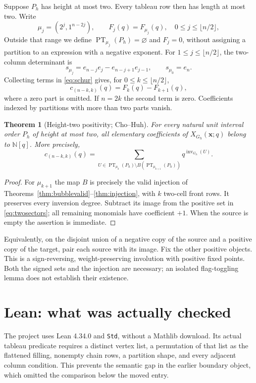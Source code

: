\documentclass[11pt,a4paper]{article}
\newtheorem{theorem}{Theorem}[section]
\theoremstyle{definition}
\newcommand{\PT}{\operatorname{PT}}
\newcommand{\inv}{\operatorname{inv}}
\newcommand{\N}{\mathbb N}
\begin{document}
Suppose $P_h$ has height at most two. Every tableau row then has length at
most two. Write
\[
 \mu_j=(2^j,1^{n-2j}),\qquad F_j(q)=F_{\mu_j}(q),
 \quad 0\le j\le\lfloor n/2\rfloor,
\]
Outside that range we define $\PT_{\mu_j}(P_h)=\varnothing$ and $F_j=0$,
without assigning a partition to an expression with a negative exponent.
For $1\le j\le\lfloor n/2\rfloor$, the two-column determinant is
\[
 s_{\mu_j}=e_{n-j}e_j-e_{n-j+1}e_{j-1},\qquad s_{\mu_0}=e_n.
\]
Collecting terms in \eqref{eq:schur} gives, for $0\le k\le\lfloor n/2\rfloor$,
\begin{equation}\label{eq:twosectors}
 c_{(n-k,k)}(q)=F_k(q)-F_{k+1}(q),
\end{equation}
where a zero part is omitted. If $n=2k$ the second term is zero.
Coefficients indexed by partitions with more than two parts vanish.

\begin{theorem}[Height-two positivity; Cho--Huh]\label{thm:positive}
For every natural unit interval order $P_h$ of height at most two, all
elementary coefficients of $X_{G_h}(\mathbf x;q)$ belong to $\N[q]$.
More precisely,
\[
 c_{(n-k,k)}(q)=
 \sum_{U\in\PT_{\mu_k}(P_h)\setminus B(\PT_{\mu_{k+1}}(P_h))}
 q^{\inv_{G_h}(U)}.
\]
\end{theorem}
\begin{proof}
For $\mu_{k+1}$ the map $B$ is precisely the valid injection of
Theorems~\ref{thm:bubblevalid}--\ref{thm:injection}, with $k$ two-cell front
rows. It preserves every inversion degree. Subtract its image from the
positive set in \eqref{eq:twosectors}; all remaining monomials have coefficient
$+1$. When the source is empty the assertion is immediate.
\end{proof}

Equivalently, on the disjoint union of a negative copy of the source and a
positive copy of the target, pair each source with its image. Fix the other
positive objects. This is a sign-reversing, weight-preserving involution with
positive fixed points. Both the signed sets and the injection are necessary;
an isolated flag-toggling lemma does not establish their existence.

\section{Lean: what was actually checked}

The project uses Lean 4.34.0 and \texttt{Std}, without a Mathlib download.
Its actual tableau predicate requires a distinct vertex list, a permutation
of that list as the flattened filling, nonempty chain rows, a partition
shape, and every adjacent column condition. This prevents the semantic gap
in the earlier boundary object, which omitted the comparison below the moved
entry.
\end{document}
